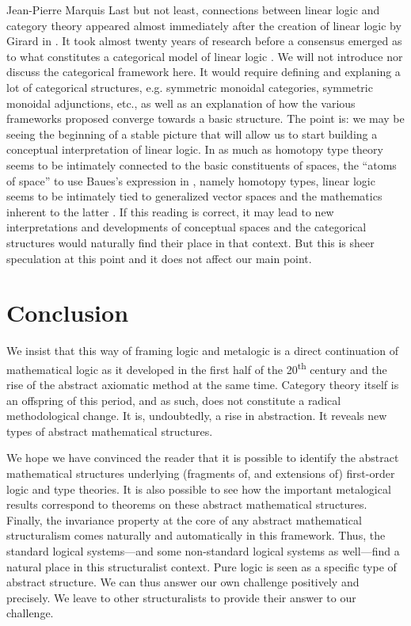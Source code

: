 \begin{artengenv}{Jean-Pierre Marquis}
Last but not least, connections between linear logic and category theory appeared almost immediately after the creation of linear logic by Girard in \parencite*{Girard1987} \parencite[see][]{Lafont1988,Seely1989}. It took almost twenty years of research before a consensus emerged as to what constitutes a categorical model of linear logic  \parencite[see][]{Bierman1995,BluteScott2004,Mellies09,DePaiva2014}.  We will not introduce nor discuss the categorical framework here. It would require defining and explaning a lot of categorical structures, e.g. symmetric monoidal categories, symmetric monoidal adjunctions, etc., as well as an explanation of  how the various frameworks proposed converge towards a basic structure. The point is: we may be seeing the beginning of a stable picture that will allow us to start building a conceptual interpretation of linear logic. In as much as homotopy type theory seems to be intimately connected to the basic constituents of spaces, the ``atoms of space'' to use Baues's expression in \parencite*{Baues2002}, namely homotopy types, linear logic seems to be intimately tied to generalized vector spaces and the mathematics inherent to the latter \parencite[see][]{Mellies2020}. If this reading is correct, it may lead to new interpretations and developments of conceptual spaces and the categorical structures would naturally find their place in that context. But this is sheer speculation at this point and it does not affect our main point.

\section{Conclusion}

We  insist that this way of framing logic and metalogic is a direct continuation of mathematical logic as it developed in the first half of the 20\textsuperscript{th} century and the rise of the abstract axiomatic method at the same time. Category theory itself is an offspring of this period, and as such, does not constitute a radical methodological change. It is, undoubtedly, a rise in abstraction. It reveals new types of abstract mathematical structures. 

We hope we have convinced the reader that it is possible to identify the abstract mathematical structures underlying (fragments of, and extensions of) first-order logic and type theories. It is also possible to see how the important metalogical results correspond to theorems on these abstract mathematical structures. Finally, the invariance property at the core of any abstract mathematical structuralism comes naturally and automatically in this framework. Thus, the standard logical systems---and some non-standard logical systems as well---find a natural place in this structuralist context. Pure logic is seen as a specific type of abstract structure. We can thus answer our own challenge positively and precisely. We leave to other structuralists to provide their answer to our challenge.



\end{artengenv}